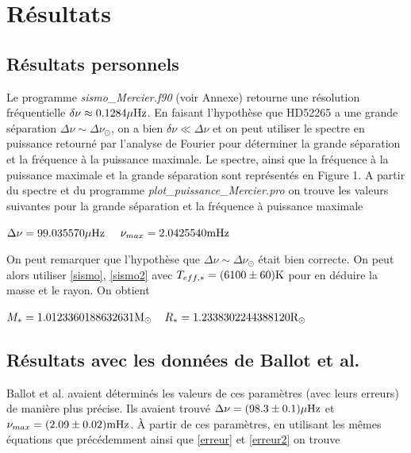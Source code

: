 \documentclass[a4paper,11pt]{article}
\numberwithin{equation}{section}
\begin{document}
\section{Résultats}
\subsection{Résultats personnels}
Le programme \textit{sismo\_Mercier.f90} (voir Annexe) retourne une résolution fréquentielle $\delta\nu \approx 0.1284 \rm \mu Hz$. En faisant l'hypothèse que HD52265 a une
grande séparation $\Delta \nu \sim \Delta \nu_{\odot}$, on a bien $\delta\nu \ll \Delta \nu$ et on peut utiliser le spectre en puissance retourné par l'analyse
de Fourier pour déterminer la grande séparation et la fréquence à la puissance maximale.\newline
Le spectre, ainsi que la fréquence à la puissance maximale et la grande séparation sont représentés en Figure 1. A partir du spectre et du programme \textit{plot\_puissance\_Mercier.pro} on trouve les valeurs suivantes pour la grande séparation et la fréquence à puissance maximale\newline

\begin{center}
$\Delta \nu = 99.035570 \rm \mu Hz$ \        \ $\nu_{max} = 2.0425540 \rm mHz$
\end{center}

On peut remarquer que l'hypothèse que $\Delta \nu \sim \Delta \nu_{\odot}$ était bien correcte. \newline
On peut alors utiliser \ref{sismo}, \ref{sismo2} avec $T_{eff,*} = (6100 \pm 60)\rm K$ pour en déduire la masse et le rayon. On obtient

\begin{center}
$M_{*} = 1.0123360188632631 \rm M_{\odot}$\   \ $R_{*} =  1.2338302244388120 \rm R_{\odot}$
\end{center}

\subsection{Résultats avec les données de Ballot et al.}
Ballot et al. avaient déterminés les valeurs de ces paramètres (avec leurs erreurs) de manière plus précise. Ils avaient trouvé $\Delta \nu = (98.3 \pm 0.1) \rm \mu Hz$ et
 $\nu_{max} = (2.09 \pm 0.02) \rm mHz$. 
À partir de ces paramètres, en utilisant les mêmes équations que précédemment ainsi que \ref{erreur} et \ref{erreur2} on trouve
\end{document}
